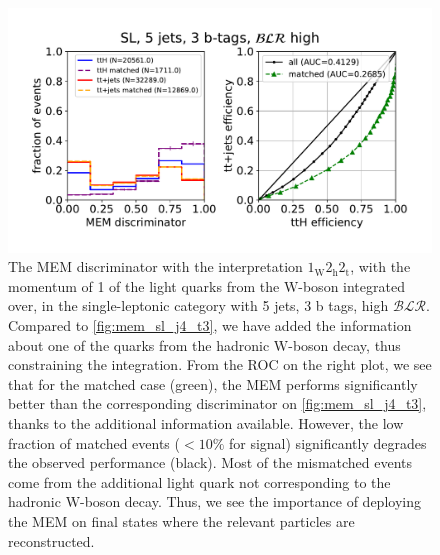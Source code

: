 \begin{figure}
\begin{centering}
\includegraphics[width = 1.0\textwidth]{figures/mem_sl_j5_t3_blrH.pdf}
\caption{The MEM discriminator with the interpretation $1_{\mathrm{W}} 2_{\mathrm{h}} 2_{\mathrm{t}}$, with the momentum of 1 of the light quarks from the $\mathrm{W}$-boson integrated over, in the single-leptonic category with 5 jets, 3 b tags, high $\mathcal{BLR}$. Compared to \cref{fig:mem_sl_j4_t3}, we have added the information about one of the quarks from the hadronic $\mathrm{W}$-boson decay, thus constraining the integration. From the ROC on the right plot, we see that for the matched case (green), the MEM performs significantly better than the corresponding discriminator on \cref{fig:mem_sl_j4_t3}, thanks to the additional information available. However, the low fraction of matched events ($< 10\%$ for signal) significantly degrades the observed performance (black). Most of the mismatched events come from the additional light quark not corresponding to the hadronic $\mathrm{W}$-boson decay. Thus, we see the importance of deploying the MEM on final states where the relevant particles are reconstructed.}
\label{fig:mem_sl_j5_t3}
\end{centering}
\end{figure}

